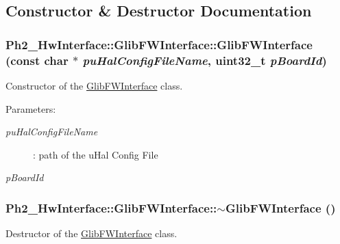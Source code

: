 \subsection{Constructor \& Destructor Documentation}
\hypertarget{class_ph2___hw_interface_1_1_glib_f_w_interface_ef1044c390e934afa17cdf9566ac71c3}{
\subsubsection[GlibFWInterface]{\setlength{\rightskip}{0pt plus 5cm}Ph2\_\-Hw\-Interface::Glib\-FWInterface::Glib\-FWInterface (const char $\ast$ {\em pu\-Hal\-Config\-File\-Name}, uint32\_\-t {\em p\-Board\-Id})}}
\label{class_ph2___hw_interface_1_1_glib_f_w_interface_ef1044c390e934afa17cdf9566ac71c3}


Constructor of the \hyperlink{class_ph2___hw_interface_1_1_glib_f_w_interface}{Glib\-FWInterface} class. 

\begin{Desc}
\item[Parameters:]
\begin{description}
\item[{\em pu\-Hal\-Config\-File\-Name}]: path of the u\-Hal Config File \item[{\em p\-Board\-Id}]\end{description}
\end{Desc}
\hypertarget{class_ph2___hw_interface_1_1_glib_f_w_interface_8cd8fec61b8e8327b142beddcd512b34}{
\subsubsection[$\sim$GlibFWInterface]{\setlength{\rightskip}{0pt plus 5cm}Ph2\_\-Hw\-Interface::Glib\-FWInterface::$\sim$Glib\-FWInterface ()}}
\label{class_ph2___hw_interface_1_1_glib_f_w_interface_8cd8fec61b8e8327b142beddcd512b34}


Destructor of the \hyperlink{class_ph2___hw_interface_1_1_glib_f_w_interface}{Glib\-FWInterface} class. 



